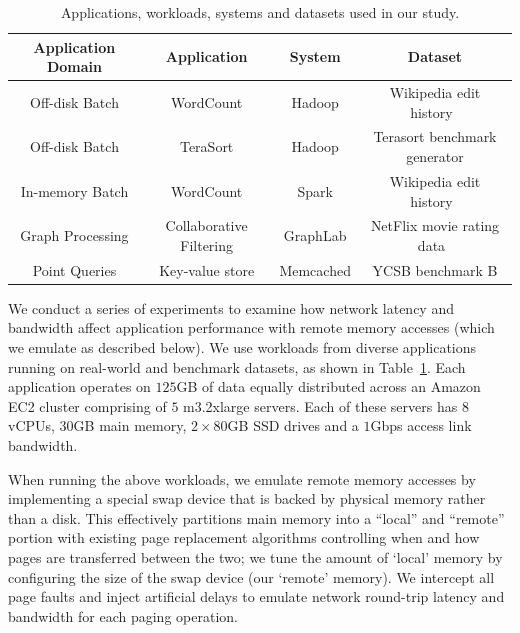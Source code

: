 %
\begin{table}
	\centering
	\caption{\small{Applications, workloads, systems and datasets used in our study.}}
	\label{tab:workloads}
	\vspace{0.1in}
  \begin{tabular}{c|c|c|c}
	  \hline
		\textbf{Application Domain} & \textbf{Application} & \textbf{System} & \textbf{Dataset} \\\hline \hline
    Off-disk Batch & WordCount & Hadoop & Wikipedia edit history~\cite{wikipedia}\\\hline
    Off-disk Batch & TeraSort & Hadoop & Terasort benchmark generator\\\hline
    In-memory Batch & WordCount & Spark & Wikipedia edit history~\cite{wikipedia}\\\hline
    Graph Processing & Collaborative Filtering & GraphLab & NetFlix movie rating data~\cite{netflix}\\\hline
    Point Queries & Key-value store & Memcached & YCSB benchmark B\\\hline
    \hline
\end{tabular}
\end{table}

%

We conduct a series of experiments to examine how network latency and bandwidth affect application performance with remote memory accesses (which we emulate as described below). 
We use workloads from diverse applications running on real-world and benchmark datasets, as shown in Table~\ref{tab:workloads}. %
 Each application operates on $125$GB of data equally distributed across an Amazon EC2 cluster comprising of $5$ m3.2xlarge servers. Each of these servers has $8$ vCPUs, $30$GB main memory, $2 \times 80$GB SSD drives and a $1$Gbps access link bandwidth.


When running the above workloads, we emulate remote memory accesses by implementing a special swap device that is backed by physical memory rather than a disk. This effectively partitions main memory into a ``local'' and ``remote'' portion 
with existing page replacement algorithms controlling when and how pages are transferred between the two; we tune the amount of `local' memory by configuring the size of the swap device (our `remote' memory).
We intercept all page faults and inject artificial delays to emulate network round-trip latency and bandwidth for each paging operation. 

